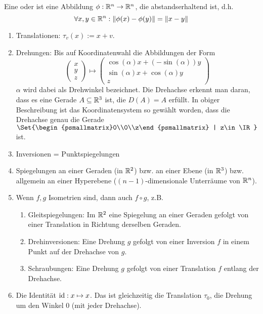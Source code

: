 \begin{definition}
Eine  oder  ist eine Abbildung $\phi:\mathbb{R}^n\to\mathbb{R}^n$, die abstandserhaltend ist, d.h.
\[\forall x,y\in\mathbb{R}^n: \lVert\phi(x)-\phi(y)\rVert = \lVert x-y\rVert\]
\end{definition}

\begin{example}
\begin{enumerate}
\item Translationen: $\tau_v(x) := x+v$.
\item Drehungen: Bis auf Koordinatenwahl die Abbildungen der Form
\[\begin{pmatrix}x\\y\\z\end{pmatrix}\mapsto\begin{pmatrix}
\cos(\alpha)x + (-\sin(\alpha)) y \\
\sin(\alpha)x + \cos(\alpha)y \\
z
\end{pmatrix}\]
$\alpha$ wird dabei als Drehwinkel bezeichnet. Die Drehachse erkennt man daran, dass es eine Gerade $A\subseteq\mathbb{R}^3$ ist, die $D(A)=A$ erfüllt. In obiger Beschreibung ist das Koordinatensystem so gewählt worden, dass die Drehachse genau die Gerade $\Set{\begin{psmallmatrix}0\\0\\z\end{psmallmatrix} | z\in\IR}$ ist.
\item Inversionen = Punktspiegelungen
\item Spiegelungen an einer Geraden (in $\mathbb{R}^2$) bzw. an einer Ebene (in $\mathbb{R}^3$) bzw. allgemein an einer Hyperebene ($(n-1)$-dimensionale Unterräume von $\mathbb{R}^n$).
\item Wenn $f,g$ Isometrien sind, dann auch $f\circ g$, z.B.
\begin{enumerate}
\item Gleitspiegelungen: Im $\mathbb{R}^2$ eine Spiegelung an einer Geraden gefolgt von einer Translation in Richtung derselben Geraden.
\item Drehinversionen: Eine Drehung $g$ gefolgt von einer Inversion $f$ in einem Punkt auf der Drehachse von $g$.
\item Schraubungen: Eine Drehung $g$ gefolgt von einer Translation $f$ entlang der Drehachse.
\end{enumerate}
\item Die Identität $\operatorname{id}: x\mapsto x$. Das ist gleichzeitig die Translation $\tau_0$, die Drehung um den Winkel $0$ (mit jeder Drehachse).
\end{enumerate}
\end{example}

